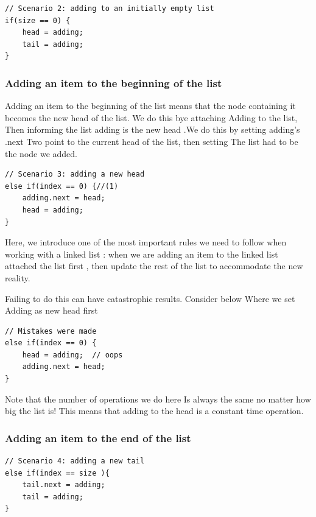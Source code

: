 \documentclass[10pt,a4paper]{book}
\begin{document}
\begin{verbatim}
// Scenario 2: adding to an initially empty list
if(size == 0) {
	head = adding;
	tail = adding;
}	
\end{verbatim}



\subsubsection{Adding an item to the beginning of the list}
Adding an item to the beginning of the list means that the node containing it becomes the new head of the list.  We do this bye attaching Adding to the list, Then informing the list adding is the new head .We do this by setting adding's .next Two point to the current head of the list, then setting The list had to be the node we added.

\begin{verbatim}
// Scenario 3: adding a new head
else if(index == 0) {//(1)
	adding.next = head;
	head = adding;
}
\end{verbatim}



Here, we introduce one of the most important rules we need to follow when working with a linked list : when we are adding an item to the linked list attached the list first , then update the rest of the list to accommodate the new reality.

Failing to do this can have catastrophic results.  Consider below Where we set Adding as new head first 



\begin{verbatim}
// Mistakes were made
else if(index == 0) {
	head = adding;  // oops
	adding.next = head;
}
\end{verbatim}




Note that the number of operations we do here Is always the same no matter how big the list is!  This means that adding to the head is a constant time operation.

\subsubsection{Adding an item to the end of the list}
\begin{verbatim}
// Scenario 4: adding a new tail
else if(index == size ){
	tail.next = adding;
	tail = adding;
}
\end{verbatim}
\end{document}
